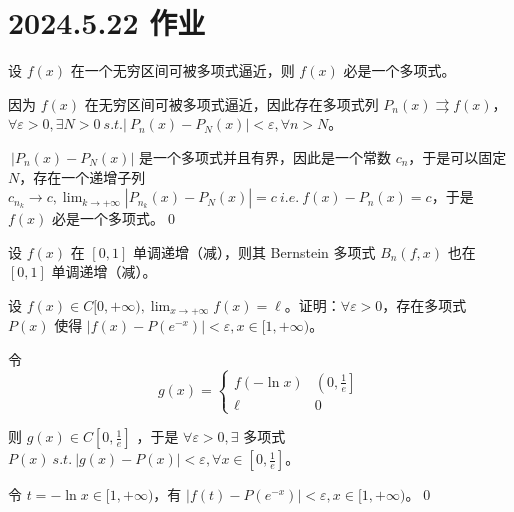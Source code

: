 \ifx\allfiles\undefined

\date{}
\author{尹锦润}

\maketitle
\fi

\section{2024.5.22 作业}
\begin{ques}
	设 $\displaystyle f( x)$ 在一个无穷区间可被多项式逼近，则 $\displaystyle f( x)$ 必是一个多项式。
\end{ques}



因为 $\displaystyle f( x)$ 在无穷区间可被多项式逼近，因此存在多项式列 $\displaystyle P_{n}( x) \rightrightarrows f( x)$，$\displaystyle \forall \varepsilon  >0,\exists N >0\ s.t.|\ P_{n}( x) -P_{N}( x) |< \varepsilon ,\forall n >N$。

$\displaystyle \ |P_{n}( x) -P_{N}( x) |$ 是一个多项式并且有界，因此是一个常数 $\displaystyle c_{n}$，于是可以固定 $\displaystyle N$，存在一个递增子列 $\displaystyle c_{n_{k}}\rightarrow c,\lim _{k\rightarrow +\infty } |P_{n_{k}}( x) -P_{N}( x) |=c\ i.e.\ f( x) -P_{n}( x) =c$，于是 $\displaystyle f( x)$ 必是一个多项式。\qed 





\begin{ques}
	设 $\displaystyle f( x)$ 在 $\displaystyle [ 0,1]$ 单调递增（减），则其 Bernstein 多项式 $\displaystyle B_{n}( f,x)$ 也在 $\displaystyle [ 0,1]$ 单调递增（减）。
\end{ques}



\vspace{30\baselineskip}





\begin{ques}
	设 $\displaystyle f( x) \in C[ 0,+\infty ) ,\lim _{x\rightarrow +\infty } f( x) =\ell $。证明：$\displaystyle \forall \varepsilon  >0$，存在多项式 $\displaystyle P( x)$ 使得 $\displaystyle |f( x) -P\left( e^{-x}\right) |< \varepsilon ,x\in [ 1,+\infty )$。
\end{ques}

令
\begin{equation*}
	g( x) =\begin{cases}
		f( -\ln x) & \left( 0,\frac{1}{e}\right]\\
		\ell  & 0
	\end{cases}
\end{equation*}

则 $\displaystyle g( x) \in C\left[ 0,\frac{1}{e}\right]$ ，于是 $\displaystyle \forall \varepsilon  >0,\exists $ 多项式 $\displaystyle P( x) \ s.t.\ |g( x) -P( x) |< \varepsilon ,\forall x\in \left[ 0,\frac{1}{e}\right]$。

令 $\displaystyle t=-\ln x\in [ 1,+\infty )$，有 $\displaystyle |f( t) -P\left( e^{-x}\right) |< \varepsilon ,x\in [ 1,+\infty )$。\qed 
\ifx\allfiles\undefined

\fi